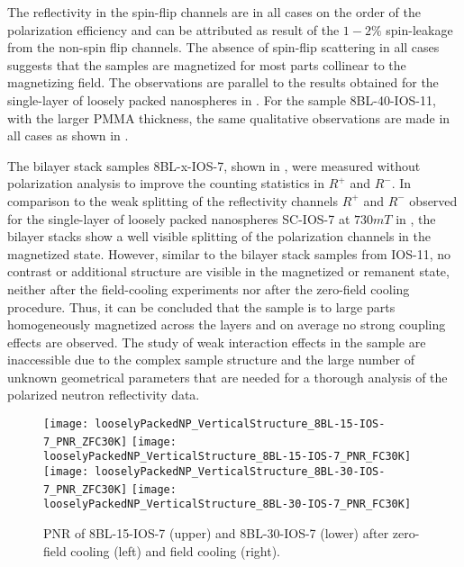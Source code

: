 \documentclass[\main/dresen_thesis.tex]{subfiles}
\begin{document}
  The reflectivity in the spin-flip channels are in all cases on the order of the polarization efficiency and can be attributed as result of the $1 - 2 \%$ spin-leakage from the non-spin flip channels.
  The absence of spin-flip scattering in all cases suggests that the samples are magnetized for most parts collinear to the magnetizing field.
  The observations are parallel to the results obtained for the single-layer of loosely packed nanospheres in .
  For the sample 8BL-40-IOS-11, with the larger PMMA thickness, the same qualitative observations are made in all cases as shown in .

  The bilayer stack samples 8BL-x-IOS-7, shown in , were measured without polarization analysis to improve the counting statistics in $R^{+}$ and $R^{-}$.
  In comparison to the weak splitting of the reflectivity channels $R^{+}$ and $R^{-}$ observed for the single-layer of loosely packed nanospheres SC-IOS-7 at $730 \unit{mT}$ in , the bilayer stacks show a well visible splitting of the polarization channels in the magnetized state.
  However, similar to the bilayer stack samples from IOS-11, no contrast or additional structure are visible in the magnetized or remanent state, neither after the field-cooling experiments nor after the zero-field cooling procedure.
  Thus, it can be concluded that the sample is to large parts homogeneously magnetized across the layers and on average no strong coupling effects are observed.
  The study of weak interaction effects in the sample are inaccessible due to the complex sample structure and the large number of unknown geometrical parameters that are needed for a thorough analysis of the polarized neutron reflectivity data.

  \begin{figure}[tb]
    \centering
    \texttt{[image: looselyPackedNP\_VerticalStructure\_8BL-15-IOS-7\_PNR\_ZFC30K]}
    \texttt{[image: looselyPackedNP\_VerticalStructure\_8BL-15-IOS-7\_PNR\_FC30K]}
    \texttt{[image: looselyPackedNP\_VerticalStructure\_8BL-30-IOS-7\_PNR\_ZFC30K]}
    \texttt{[image: looselyPackedNP\_VerticalStructure\_8BL-30-IOS-7\_PNR\_FC30K]}
    \caption{\label{fig:looselyPackedNP:bilayer:pnr:8BL-x-IOS7}PNR of 8BL-15-IOS-7 (upper) and 8BL-30-IOS-7 (lower) after zero-field cooling (left) and field cooling (right).}
  \end{figure}
\end{document}
